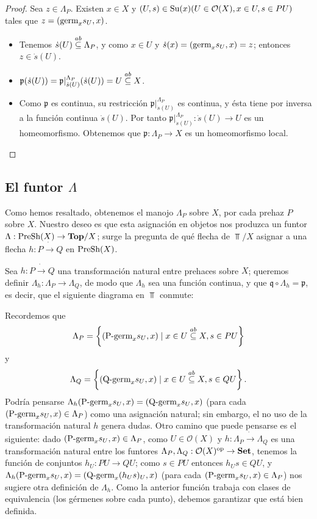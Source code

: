 \begin{proof}
   Sea $z\in\Lambda_P$. Existen $x\in X$ y $(U,s)\in\normalfont{\text{Su}}(x) (U\in\mathcal{O}(X),x\in U,s\in PU)$ tales que $z=(\normalfont{\text{germ}}_{x}s_{U},x)$.
   \begin{itemize}
      \item Tenemos $\dot{s}(U)\stackrel{ab}{\subseteq} \Lambda_P$, y como $x\in U$ y $\dot{s}(x)=(\normalfont{\text{germ}}_{x}s_{U},x)=z$; entonces $z\in\dot{s}(U)$.
      \item $\mathfrak{p}(\dot{s}(U))=\mathfrak{p}|^{\Lambda_P}_{\dot{s}(U)}(\dot{s}(U))=U\stackrel{ab}{\subseteq} X$.
      \item Como $\mathfrak{p}$ es continua, su restricción $\mathfrak{p}|^{\Lambda_P}_{\dot{s}(U)}$ es continua, y ésta tiene por inversa a la función continua $\dot{s}(U)$. Por tanto $\mathfrak{p}|^{\Lambda_P}_{\dot{s}(U)}:\dot{s}(U)\to U$ es un homeomorfismo.
      Obtenemos que $\mathfrak{p}:\Lambda_P\to X$ es un homeomorfismo local.
   \end{itemize}
\end{proof}

\subsection{El funtor $\Lambda$}
Como hemos resaltado, obtenemos el manojo $\Lambda_P$ sobre $X$, por cada prehaz $P$ sobre $X$. Nuestro deseo es que esta asignación en objetos nos produzca un funtor $\Lambda:\normalfont{\text{PreSh}}(X)\to\normalfont{\textbf{Top}}/X$; surge la pregunta de qué flecha de $\Top/X$ asignar a una flecha $h:P\dot{\to} Q$ en $\normalfont{\text{PreSh}}(X)$.

Sea $h:P\dot{\to}Q$ una transformación natural entre prehaces sobre $X$; queremos definir $\Lambda_h:\Lambda_{P}\to\Lambda_{Q}$, de modo que $\Lambda_h$ sea una función continua, y que $\mathfrak{q}\circ\Lambda_h=\mathfrak{p}$, es decir, que el siguiente diagrama en $\Top$ conmute:

Recordemos que 
$$
   \Lambda_P=\left\lbrace (\normalfont{\text{P-germ}}_{x}s_{U},x)\mid x\in U\stackrel{ab}{\subseteq} X, s\in PU\right\rbrace
$$
y
$$
   \Lambda_Q=\left\lbrace (\normalfont{\text{Q-germ}}_{x}s_{U},x)\mid x\in U\stackrel{ab}{\subseteq} X, s\in QU\right\rbrace.
$$
Podría pensarse $\Lambda_h(\normalfont{\text{P-germ}}_{x}s_{U},x)=(\normalfont{\text{Q-germ}}_{x}s_{U},x)$ (para cada $(\normalfont{\text{P-germ}}_{x}s_{U},x)\in\Lambda_P$) como una asignación natural; sin embargo, el no uso de la transformación natural $h$ genera dudas. Otro camino que puede pensarse es el siguiente: dado $(\normalfont{\text{P-germ}}_{x}s_{U},x)\in \Lambda_P$, como $U\in\mathcal{O}(X)$ y $h:\Lambda_P\dot{\to}\Lambda_Q$ es una transformación natural entre los funtores $\Lambda_P,\Lambda_Q:\mathcal{O}(X)^{\text{op}}\to\normalfont{\textbf{Set}}$, tenemos la función de conjuntos $h_{U}:PU\to QU$; como $s\in PU$ entonces $h_{U}s\in QU$, y $\Lambda_h(\normalfont{\text{P-germ}}_{x}s_{U},x)=(\normalfont{\text{Q-germ}}_{x}(h_{U}s)_{U},x)$ (para cada $(\normalfont{\text{P-germ}}_{x}s_{U},x)\in\Lambda_P$) nos sugiere otra definición de $\Lambda_h$. Como la anterior función trabaja con clases de equivalencia (los gérmenes sobre cada punto), debemos garantizar que está bien definida. 

